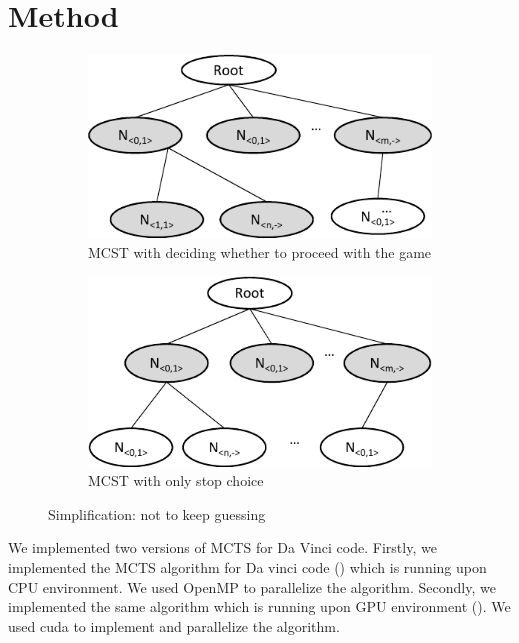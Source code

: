 
\section{Method}

\begin{figure}
\begin{subfigure}[b]{0.95\columnwidth}
\includegraphics [width=0.95\columnwidth]{figures/sub_guess_1.pdf}
\caption{MCST with deciding whether to proceed with the game }
\label{fig:proceed_game}
\end{subfigure}
\par\bigskip
\begin{subfigure}[b]{0.95\columnwidth}
\includegraphics [width=0.95\columnwidth]{figures/sub_guess_2.pdf}
\caption{MCST with only stop choice}
\label{fig:stop_game}
\end{subfigure}
\caption{Simplification: not to keep guessing}
\end{figure}


We implemented two versions of MCTS for Da Vinci code. 
Firstly, we implemented the MCTS algorithm for Da vinci code (\cpu) which is running upon CPU environment.
We used OpenMP to parallelize the algorithm.
Secondly, we implemented the same algorithm which is running upon GPU environment (\gpu).
We used cuda to implement and parallelize the algorithm.

